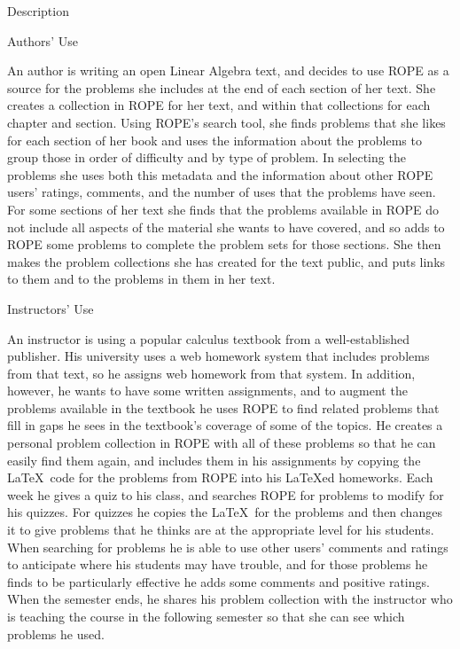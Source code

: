 \documentclass[11pt]{article}
\begin{document}
\begin{section}{Description}

\begin{subsection}{Authors' Use}

An author is writing an open Linear Algebra text, and decides to use ROPE
as a source for the problems she includes at the end of each section of
her text.  She creates a collection in ROPE for her text, and within that
collections for each chapter and section.  Using ROPE's search tool, she
finds problems that she likes for each section of her book and uses the
information about the problems to group those in order of difficulty and
by type of problem.  In selecting the problems she uses both this metadata
and the information about other ROPE users' ratings, comments, and the
number of uses that the problems have seen.  For some sections of her
text she finds that the problems available in ROPE do not include all
aspects of the material she wants to have covered, and so adds to ROPE
some problems to complete the problem sets for those sections.  She then
makes the problem collections she has created for the text public, and
puts links to them and to the problems in them in her text.

\end{subsection}

\begin{subsection}{Instructors' Use}

An instructor is using a popular calculus textbook from a well-established
publisher.  His university uses a web homework system that includes
problems from that text, so he assigns web homework from that system.  In
addition, however, he wants to have some written assignments, and to
augment the problems available in the textbook he uses ROPE to find
related problems that fill in gaps he sees in the textbook's coverage of
some of the topics.  He creates a personal problem collection in ROPE with
all of these problems so that he can easily find them again, and includes
them in his assignments by copying the \LaTeX\ code for the problems from
ROPE into his \LaTeX ed homeworks.  Each week he gives a quiz to his
class, and searches ROPE for problems to modify for his quizzes.  For
quizzes he copies the \LaTeX\ for the problems and then changes it to give
problems that he thinks are at the appropriate level for his students.
When searching for problems he is able to use other users' comments and
ratings to anticipate where his students may have trouble, and for those
problems he finds to be particularly effective he adds some comments and
positive ratings.  When the semester ends, he shares his problem
collection with the instructor who is teaching the course in the following
semester so that she can see which problems he used.


\end{subsection}
\end{section}
\end{document}
